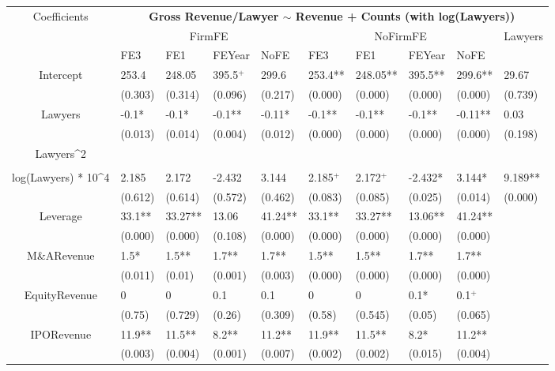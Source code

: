 \documentclass{article}
\begin{document}
\begin{table}[H]
\centering
\begin{tabular}{|clllllllll|}
\hline
\multirow{3}{*}{Coefficients} & \multicolumn{9}{c|}{\textbf{Gross Revenue/Lawyer $\sim$ Revenue + Counts (with log(Lawyers))}} \\
\cline{2-10}
& \multicolumn{4}{c}{FirmFE} & \multicolumn{4}{c}{NoFirmFE} & \multirow{2}{*}{Lawyers} \\
\cline{2-9}
& FE3 & FE1 & FEYear & NoFE & FE3 & FE1 & FEYear & NoFE &  \\
\hline
 
Intercept & 253.4 & 248.05 & 395.5$^{+}$ & 299.6 & 253.4** & 248.05** & 395.5** & 299.6** & 29.67 \\ 
   & (0.303) & (0.314) & (0.096) & (0.217) & (0.000) & (0.000) & (0.000) & (0.000) & (0.739) \\ 
  Lawyers & -0.1* & -0.1* & -0.1** & -0.11* & -0.1** & -0.1** & -0.1** & -0.11** & 0.03 \\ 
   & (0.013) & (0.014) & (0.004) & (0.012) & (0.000) & (0.000) & (0.000) & (0.000) & (0.198) \\ 
  Lawyers^2 &  &  &  &  &  &  &  &  &  \\ 
   &  &  &  &  &  &  &  &  &  \\ 
  log(Lawyers) * 10^4 & 2.185 & 2.172 & -2.432 & 3.144 & 2.185$^{+}$ & 2.172$^{+}$ & -2.432* & 3.144* & 9.189** \\ 
   & (0.612) & (0.614) & (0.572) & (0.462) & (0.083) & (0.085) & (0.025) & (0.014) & (0.000) \\ 
  Leverage & 33.1** & 33.27** & 13.06 & 41.24** & 33.1** & 33.27** & 13.06** & 41.24** &  \\ 
   & (0.000) & (0.000) & (0.108) & (0.000) & (0.000) & (0.000) & (0.000) & (0.000) &  \\ 
  M\&ARevenue & 1.5* & 1.5** & 1.7** & 1.7** & 1.5** & 1.5** & 1.7** & 1.7** &  \\ 
   & (0.011) & (0.01) & (0.001) & (0.003) & (0.000) & (0.000) & (0.000) & (0.000) &  \\ 
  EquityRevenue & 0 & 0 & 0.1 & 0.1 & 0 & 0 & 0.1* & 0.1$^{+}$ &  \\ 
   & (0.75) & (0.729) & (0.26) & (0.309) & (0.58) & (0.545) & (0.05) & (0.065) &  \\ 
  IPORevenue & 11.9** & 11.5** & 8.2** & 11.2** & 11.9** & 11.5** & 8.2* & 11.2** &  \\ 
   & (0.003) & (0.004) & (0.001) & (0.007) & (0.002) & (0.002) & (0.015) & (0.004) &  \\ 

\end{tabular}
\end{table}
\end{document}

